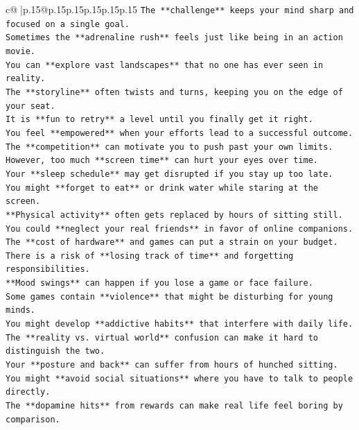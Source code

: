 \documentclass{article}
\begin{document}
{\begin{supertabular}{c@{$\;$}|p{.15\linewidth}@{}p{.15\linewidth}p{.15\linewidth}p{.15\linewidth}p{.15\linewidth}p{.15\linewidth}}
{{{\texttt{The **challenge** keeps your mind sharp and focused on a single goal.} \\
\texttt{Sometimes the **adrenaline rush** feels just like being in an action movie.} \\
\texttt{You can **explore vast landscapes** that no one has ever seen in reality.} \\
\texttt{The **storyline** often twists and turns, keeping you on the edge of your seat.} \\
\texttt{It is **fun to retry** a level until you finally get it right.} \\
\texttt{You feel **empowered** when your efforts lead to a successful outcome.} \\
\texttt{The **competition** can motivate you to push past your own limits.} \\
\texttt{However, too much **screen time** can hurt your eyes over time.} \\
\texttt{Your **sleep schedule** may get disrupted if you stay up too late.} \\
\texttt{You might **forget to eat** or drink water while staring at the screen.} \\
\texttt{**Physical activity** often gets replaced by hours of sitting still.} \\
\texttt{You could **neglect your real friends** in favor of online companions.} \\
\texttt{The **cost of hardware** and games can put a strain on your budget.} \\
\texttt{There is a risk of **losing track of time** and forgetting responsibilities.} \\
\texttt{**Mood swings** can happen if you lose a game or face failure.} \\
\texttt{Some games contain **violence** that might be disturbing for young minds.} \\
\texttt{You might develop **addictive habits** that interfere with daily life.} \\
\texttt{The **reality vs. virtual world** confusion can make it hard to distinguish the two.} \\
\texttt{Your **posture and back** can suffer from hours of hunched sitting.} \\
\texttt{You might **avoid social situations** where you have to talk to people directly.} \\
\texttt{The **dopamine hits** from rewards can make real life feel boring by comparison.} \\
}}}
\end{supertabular}}
\end{document}
